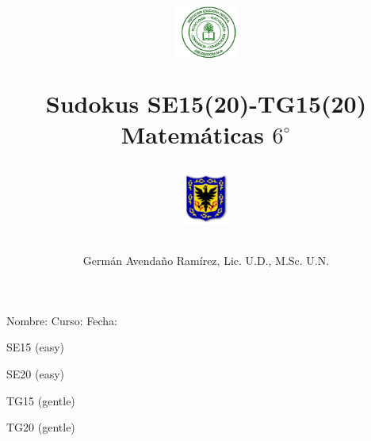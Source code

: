 \documentclass[10pt,twoside]{article}
\author{Germ\'an Avenda\~no Ram\'irez, Lic. U.D., M.Sc. U.N.}
\title{\begin{minipage}{.2\textwidth}
\includegraphics[height=1.75cm]{Images/logo-colegio.png}\end{minipage}
\begin{minipage}{.55\textwidth}
\begin{center}
Sudokus SE15(20)-TG15(20)\\
Matemáticas $6^{\circ}$
\end{center}
\end{minipage}\hfill
\begin{minipage}{.2\textwidth}
\includegraphics[height=1.75cm]{Images/logo-sed.png} 
\end{minipage}}
\date{}
\begin{document}
\maketitle
Nombre: \hrulefill Curso: \underline{\hspace*{44pt}} Fecha: \underline{\hspace*{2.5cm}}
\vspace*{9pt}
\cluefont{\Large}
\begin{minipage}{0.45\linewidth}\begin{center}
SE15 (easy) \\
\end{center}\end{minipage}\hfill
\begin{minipage}{0.45\linewidth}\begin{center}
SE20 (easy) \\
\end{center}\end{minipage}
\vspace*{9pt}

\begin{minipage}{0.45\linewidth}\begin{center}
TG15 (gentle) \\
\end{center}\end{minipage}\hfill
\begin{minipage}{0.45\linewidth}\begin{center}
TG20 (gentle) \\
\end{center}\end{minipage}
\end{document}
